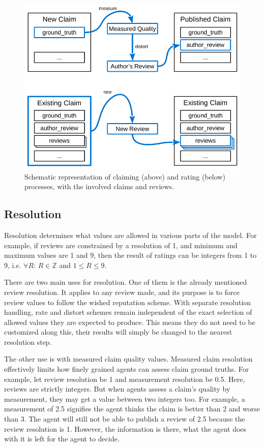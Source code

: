 \documentclass[%
    ]{\PathToTumTemplate/thesis/tum_thesis}
\begin{document}
\begin{figure}[tbp]
  \begin{center}
        \includegraphics[width=1\linewidth]	{../images/claim_rate_process-crop.pdf}
    \caption{
    Schematic representation of claiming (above) and rating (below) processes, with the involved claims and reviews.
    }
    \label{fig:claim_rate_process}
  \end{center}
\end{figure}



\subsection{Resolution}\label{sec:approach_resolution}
Resolution determines what values are allowed in various parts of the model.
For example, if reviews are constrained by a resolution of 1, and minimum and maximum values are 1 and 9, then the result of ratings can be integers from 1 to 9, i.e. $\forall R$: $R\in\mathbb{Z}$ and $1 \le R \le 9$.

There are two main uses for resolution.
One of them is the already mentioned review resolution.
It applies to any review made, and its purpose is to force review values to follow the wished reputation scheme.
With separate resolution handling, rate and distort schemes remain independent of the exact selection of allowed values they are expected to produce.
This means they do not need to be customized along this, their results will simply be changed to the nearest resolution step.

The other use is with measured claim quality values.
Measured claim resolution effectively limits how finely grained agents can assess claim ground truths.
For example, let review resolution be 1 and measurement resolution be 0.5.
Here, reviews are strictly integers.
But when agents assess a claim's quality by measurement, they may get a value between two integers too.
For example, a measurement of 2.5 signifies the agent thinks the claim is better than 2 and worse than 3.
The agent will still not be able to publish a review of 2.5 because the review resolution is 1.
However, the information is there, what the agent does with it is left for the agent to decide.
\end{document}
